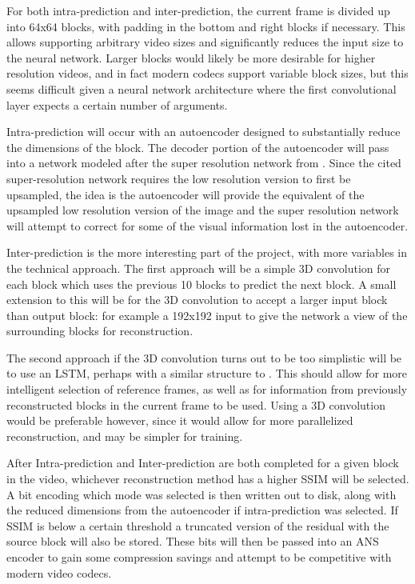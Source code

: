 \documentclass[10pt,twocolumn,letterpaper]{article}
\begin{document}
For both intra-prediction and inter-prediction, the current frame is divided up into 64x64 blocks, with padding in the bottom and right blocks if necessary. This allows supporting arbitrary video sizes and significantly reduces the input size to the neural network. Larger blocks would likely be more desirable for higher resolution videos, and in fact modern codecs support variable block sizes, but this seems difficult given a neural network architecture where the first convolutional layer expects a certain number of arguments.

Intra-prediction will occur with an autoencoder designed to substantially reduce the dimensions of the block. The decoder portion of the autoencoder will pass into a network modeled after the super resolution network from \cite{DBLP:journals/corr/DongLHT15}. Since the cited super-resolution network requires the low resolution version to first be upsampled, the idea is the autoencoder will provide the equivalent of the upsampled low resolution version of the image and the super resolution network will attempt to correct for some of the visual information lost in the autoencoder.

Inter-prediction is the more interesting part of the project, with more variables in the technical approach. The first approach will be a simple 3D convolution for each block which uses the previous 10 blocks to predict the next block. A small extension to this will be for the 3D convolution to accept a larger input block than output block: for example a 192x192 input to give the network a view of the surrounding blocks for reconstruction.

The second approach if the 3D convolution turns out to be too simplistic will be to use an LSTM, perhaps with a similar structure to \cite{prednet}. This should allow for more intelligent selection of reference frames, as well as for information from previously reconstructed blocks in the current frame to be used. Using a 3D convolution would be preferable however, since it would allow for more parallelized reconstruction, and may be simpler for training.

After Intra-prediction and Inter-prediction are both completed for a given block in the video, whichever reconstruction method has a higher SSIM will be selected. A bit encoding which mode was selected is then written out to disk, along with the reduced dimensions from the autoencoder if intra-prediction was selected. If SSIM is below a certain threshold a truncated version of the residual with the source block will also be stored. These bits will then be passed into an ANS encoder to gain some compression savings and attempt to be competitive with modern video codecs.
\end{document}
